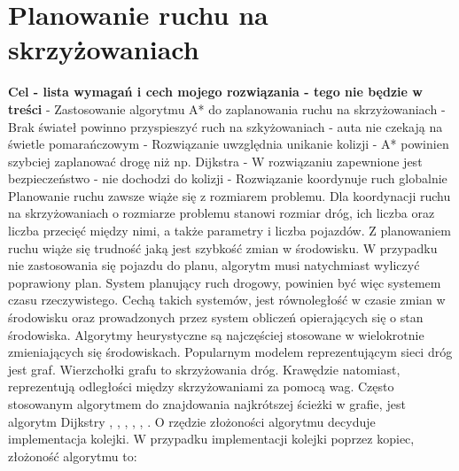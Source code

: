  \label{chap:state-of-the-art}

\section{Planowanie ruchu na skrzyżowaniach}

\textbf{Cel - lista wymagań i cech mojego rozwiązania - tego nie będzie w treści}
\newline
- Zastosowanie algorytmu A* do zaplanowania ruchu na skrzyżowaniach
\newline
- Brak świateł powinno przyspieszyć ruch na szkyżowaniach - auta nie czekają na świetle pomarańczowym
\newline
- Rozwiązanie uwzględnia unikanie kolizji
\newline
- A* powinien szybciej zaplanować drogę niż np. Dijkstra
\newline
- W rozwiązaniu zapewnione jest bezpieczeństwo - nie dochodzi do kolizji
\newline
- Rozwiązanie koordynuje ruch globalnie
\newline
\newline
\newline
\newline
\indent
  Planowanie ruchu zawsze wiąże się z rozmiarem problemu. Dla koordynacji ruchu na skrzyżowaniach o rozmiarze problemu stanowi rozmiar dróg, ich liczba oraz liczba przecięć między nimi, a także parametry i liczba pojazdów. Z planowaniem ruchu wiąże się trudność jaką jest szybkość zmian w środowisku. W przypadku nie zastosowania się pojazdu do planu, algorytm musi natychmiast wyliczyć poprawiony plan. System planujący ruch drogowy, powinien być więc systemem czasu rzeczywistego. Cechą takich systemów, jest równoległość w czasie zmian w środowisku oraz prowadzonych przez system obliczeń opierających się o stan środowiska. Algorytmy heurystyczne są najczęściej stosowane w wielokrotnie zmieniających się środowiskach.
\newline
\indent
Popularnym modelem reprezentującym sieci dróg jest graf. Wierzchołki grafu to skrzyżowania dróg. Krawędzie natomiast, reprezentują odległości między skrzyżowaniami za pomocą wag. Często stosowanym algorytmem do znajdowania najkrótszej ścieżki w grafie, jest algorytm Dijkstry \cite{shaikh2013agv}, \cite{ando2003autonomous}, \cite{huang2013improved}, \cite{gazis1997optimal}, \cite{broxmeyer1994vehicle}, \cite{kanoh2007dynamic}. O rzędzie złożoności algorytmu decyduje implementacja kolejki. W przypadku implementacji kolejki poprzez kopiec, złożoność algorytmu to:
